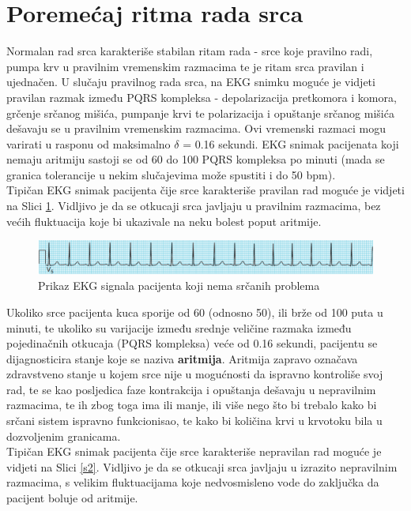 \documentclass[12pt,a4paper]{article}
\begin{document}
\newpage

\section{Poremećaj ritma rada srca}

\quad Normalan rad srca karakteriše stabilan ritam rada - srce koje pravilno radi, pumpa krv u pravilnim vremenskim razmacima te je ritam srca pravilan i ujednačen. U slučaju pravilnog rada srca, na EKG snimku moguće je vidjeti pravilan razmak između PQRS kompleksa - depolarizacija pretkomora i komora, grčenje srčanog mišića, pumpanje krvi te polarizacija i opuštanje srčanog mišića dešavaju se u pravilnim vremenskim razmacima. Ovi vremenski razmaci mogu varirati u rasponu od maksimalno $\delta$ = 0.16 sekundi. EKG snimak pacijenata koji nemaju aritmiju sastoji se od 60 do 100 PQRS kompleksa po minuti (mada se granica tolerancije u nekim slučajevima može spustiti i do 50 bpm). \cite{arrhythmia-book} \\

Tipičan EKG snimak pacijenta čije srce karakteriše pravilan rad moguće je vidjeti na Slici \ref{s1}. Vidljivo je da se otkucaji srca javljaju u pravilnim razmacima, bez većih fluktuacija koje bi ukazivale na neku bolest poput aritmije.

\begin{figure}[H]
\center
\includegraphics[scale=0.7]{../res/s1.PNG}
\caption{Prikaz EKG signala pacijenta koji nema srčanih problema}
\label{s1}
\end{figure}

Ukoliko srce pacijenta kuca sporije od 60 (odnosno 50), ili brže od 100 puta u minuti, te ukoliko su varijacije između srednje veličine razmaka između pojedinačnih otkucaja (PQRS kompleksa) veće od 0.16 sekundi, pacijentu se dijagnosticira stanje koje se naziva \textbf{aritmija}. Aritmija zapravo označava zdravstveno stanje u kojem srce nije u mogućnosti da ispravno kontroliše svoj rad, te se kao posljedica faze kontrakcija i opuštanja dešavaju u nepravilnim razmacima, te ih zbog toga ima ili manje, ili više nego što bi trebalo kako bi srčani sistem ispravno funkcionisao, te kako bi količina krvi u krvotoku bila u dozvoljenim granicama. \cite{arrhythmia-basics} \\ 

Tipičan EKG snimak pacijenta čije srce karakteriše nepravilan rad moguće je vidjeti na Slici \ref{s2}. Vidljivo je da se otkucaji srca javljaju u izrazito nepravilnim razmacima, s velikim fluktuacijama koje nedvosmisleno vode do zaključka da pacijent boluje od aritmije.
\end{document}
